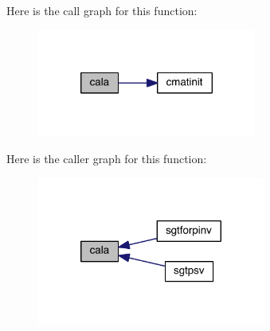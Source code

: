 Here is the call graph for this function\-:\nopagebreak
\begin{figure}[H]
\begin{center}
\leavevmode
\includegraphics[width=204pt]{calmat_8f90_a509291cbf4c7203c1f955e34cc650037_cgraph}
\end{center}
\end{figure}




Here is the caller graph for this function\-:\nopagebreak
\begin{figure}[H]
\begin{center}
\leavevmode
\includegraphics[width=212pt]{calmat_8f90_a509291cbf4c7203c1f955e34cc650037_icgraph}
\end{center}
\end{figure}


